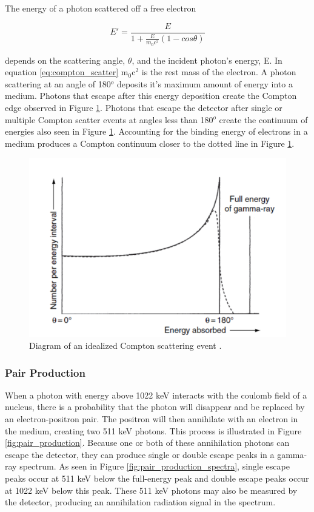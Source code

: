 The energy of a photon scattered off a free electron

\begin{equation} \label{eq:compton_scatter}
E' = \frac{E}{1 + \frac{E}{m_{0} c^2} (1-cos\theta)}
\end{equation}

depends on the scattering angle, $\theta$, and the incident photon's energy, E. In equation \ref{eq:compton_scatter} m$_{0}$c$^{2}$ is the rest mass of the electron. A photon scattering at an angle of 180$^{o}$ deposits it's maximum amount of energy into a medium. Photons that escape after this energy deposition create the Compton edge observed in Figure \ref{fig:ideal_compton}. Photons that escape the detector after single or multiple Compton scatter events at angles less than 180$^{o}$ create the continuum of energies also seen in Figure \ref{fig:ideal_compton}. Accounting for the binding energy of electrons in a medium produces a Compton continuum closer to the dotted line in Figure \ref{fig:ideal_compton}.

\begin{figure}[H]
\centering
\includegraphics[width=0.75\linewidth]{images/ideal_compton}
\caption{Diagram of an idealized Compton scattering event \cite{gilmore}.}
\label{fig:ideal_compton}
\end{figure}



\subsubsection{Pair Production}

When a photon with energy above 1022 keV interacts with the coulomb field of a nucleus, there is a probability that the photon will disappear and be replaced by an electron-positron pair. The positron will then annihilate with an electron in the medium, creating two 511 keV photons. This process is illustrated in Figure \ref{fig:pair_production}. Because one or both of these annihilation photons can escape the detector, they can produce single or double escape peaks in a gamma-ray spectrum. As seen in Figure \ref{fig:pair_production_spectra}, single escape peaks occur at 511 keV below the full-energy peak and double escape peaks occur at 1022 keV below this peak. These 511 keV photons may also be measured by the detector, producing an annihilation radiation signal in the spectrum.

